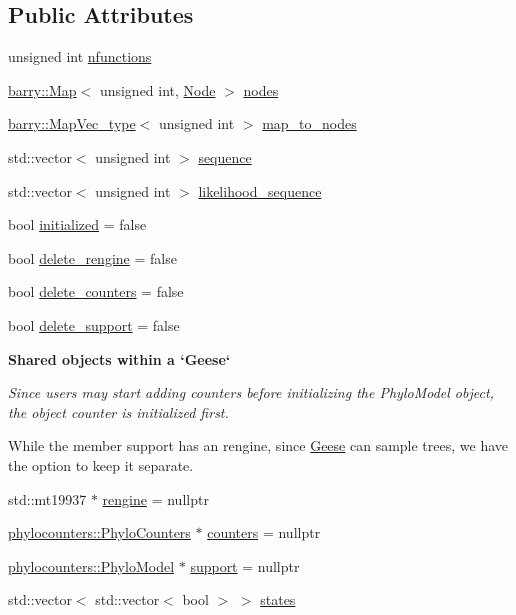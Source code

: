 \subsection*{Public Attributes}
\begin{DoxyCompactItemize}
\item 
unsigned int \hyperlink{class_geese_a0483807174fe427f5bd2ccbb22ac3ad6}{nfunctions}
\item 
\hyperlink{namespacebarry_a979a04835a9855ff2054c383c569c89e}{barry\+::\+Map}$<$ unsigned int, \hyperlink{class_node}{Node} $>$ \hyperlink{class_geese_aa574cf418c542fea64f630a3202e314f}{nodes}
\item 
\hyperlink{namespacebarry_a2f0d3aab1d67e4c8eaeab9022e16139f}{barry\+::\+Map\+Vec\+\_\+type}$<$ unsigned int $>$ \hyperlink{class_geese_a25f8324ae2c43b8a940a8e934c768a7c}{map\+\_\+to\+\_\+nodes}
\item 
std\+::vector$<$ unsigned int $>$ \hyperlink{class_geese_ab815e9b33ce2cfb5757f86083f357152}{sequence}
\item 
std\+::vector$<$ unsigned int $>$ \hyperlink{class_geese_a07298ddbdad40b6ae33649f64b12fe00}{likelihood\+\_\+sequence}
\item 
bool \hyperlink{class_geese_aa3c3181a20e367fe13e92180c83f84c0}{initialized} = false
\item 
bool \hyperlink{class_geese_a1e614555901572392026f85ff1a6b3c8}{delete\+\_\+rengine} = false
\item 
bool \hyperlink{class_geese_a2ee3f287368411747c46227568f5d03c}{delete\+\_\+counters} = false
\item 
bool \hyperlink{class_geese_a914996ac39160fb46e1ce6d70609a36a}{delete\+\_\+support} = false
\end{DoxyCompactItemize}
\begin{Indent}\textbf{ Shared objects within a `\+Geese`}\par
{\em Since users may start adding counters before initializing the Phylo\+Model object, the object {\ttfamily counter} is initialized first.

While the member {\ttfamily support} has an {\ttfamily rengine}, since {\ttfamily \hyperlink{class_geese}{Geese}} can sample trees, we have the option to keep it separate. }\begin{DoxyCompactItemize}
\item 
std\+::mt19937 $\ast$ \hyperlink{class_geese_a182ea45cab39d2c3ae6164d7f0bad30a}{rengine} = nullptr
\item 
\hyperlink{namespacebarry_1_1counters_1_1phylo_a4e401ffe66d04091343dcffaf915f8c3}{phylocounters\+::\+Phylo\+Counters} $\ast$ \hyperlink{class_geese_a4ff7c4927b192966e7765c6e6d1220d9}{counters} = nullptr
\item 
\hyperlink{namespacebarry_1_1counters_1_1phylo_ad32b4186e3bab93119df225fddc3c609}{phylocounters\+::\+Phylo\+Model} $\ast$ \hyperlink{class_geese_a71f91e3f8bea1c285c4cf1f3b84f26de}{support} = nullptr
\item 
std\+::vector$<$ std\+::vector$<$ bool $>$ $>$ \hyperlink{class_geese_a84bddd2c7e0221b4ec0e1217575584b4}{states}
\end{DoxyCompactItemize}
\end{Indent}


